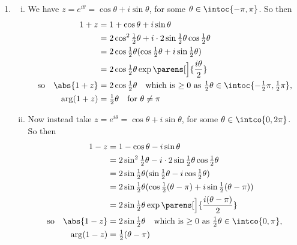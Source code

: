 \documentclass[fleqn,a4paper,11pt]{article}
\begin{document}
\begin{enumerate}
   \item
    \begin{enumerate}[(i)]
     \item
      We have \(z = e^{i\theta} = \cos \theta + i \sin \theta\), for some
      \(\theta \in \intoc{-\pi, \pi}\). So then
      \begin{align*}
       1 + z &= 1 + \cos \theta + i \sin \theta \\
            &= 2 \cos^2 \tfrac 12 \theta
                  + i \cdot 2 \sin \tfrac 12 \theta \cos \tfrac 12 \theta \\
            &= 2 \cos \tfrac 12 \theta (\cos \tfrac 12 \theta
                                           + i \sin \tfrac 12 \theta) \\
            &= 2 \cos \tfrac 12 \theta
                       \exp\parens[\Big]{\frac{i\theta}2} \\
       \text{so}\quad \abs{1 + z} &= 2 \cos \tfrac 12 \theta \quad
                      \text{which is \(\ge 0\) as
                            \(\tfrac 12 \theta \in
                              \intoc{-\tfrac 12 \pi, \tfrac 12 \pi}\),} \\
                 \arg(1 + z) &= \tfrac 12 \theta \quad
                    \text{for \(\theta \ne \pi\)}
      \end{align*}
     \item
      Now instead take \(z = e^{i\theta} = \cos \theta + i \sin \theta\), for
      some \(\theta \in \intco{0, 2\pi}\). So then
      \begin{align*}
       1 - z &= 1 - \cos \theta - i \sin \theta \\
            &= 2 \sin^2 \tfrac 12 \theta
                  - i \cdot 2 \sin \tfrac 12 \theta \cos \tfrac 12 \theta \\
            &= 2 \sin \tfrac 12 \theta (\sin \tfrac 12 \theta
                                           - i \cos \tfrac 12 \theta) \\
            &= 2 \sin \tfrac 12 \theta (\cos \tfrac 12 (\theta - \pi)
                                           + i \sin \tfrac 12 (\theta - \pi)) \\
            &= 2 \sin \tfrac 12 \theta
                       \exp\parens[\Big]{\frac{i(\theta - \pi)}2} \\
       \text{so}\quad \abs{1 - z} &= 2 \sin \tfrac 12 \theta \quad
                         \text{which is \(\ge 0\) as
                         \(\tfrac 12 \theta \in \intco{0, \pi}\),} \\
                 \arg(1 - z) &= \tfrac 12 (\theta - \pi) \quad

\end{align*}
\end{enumerate}
\end{enumerate}
\end{document}
